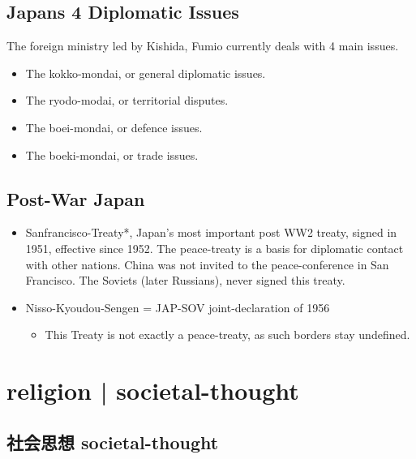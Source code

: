 \documentclass{article}
\newcommand\tabni[1][0.2cm]{\hspace*{#1}}
\begin{document}
\subsection {Japans 4 Diplomatic Issues}
The foreign ministry led by Kishida, Fumio currently deals with 4 main issues.
\begin{itemize}
    \item The kokko-mondai, or general diplomatic issues.
    \item The ryodo-modai, or territorial disputes.
    \item The boei-mondai, or defence issues.
    \item The boeki-mondai, or trade issues.
\end{itemize}
\subsection{Post-War Japan}
\begin{itemize}
    \item Sanfrancisco-Treaty*, Japan's most important post WW2 treaty, signed in 1951, effective since 1952. The peace-treaty is a basis for diplomatic contact with other nations. China was not invited to the peace-conference in San Francisco. The Soviets (later Russians), never signed this treaty.
    \item Nisso-Kyoudou-Sengen = JAP-SOV joint-declaration of 1956
    \begin{itemize}
        \item This Treaty is not exactly a peace-treaty, as such borders stay undefined.
    \end{itemize}
\end{itemize}
\section{ \tabni religion |  \tabni societal-thought }
\subsection{社会思想 \tabni societal-thought}
\end{document}
